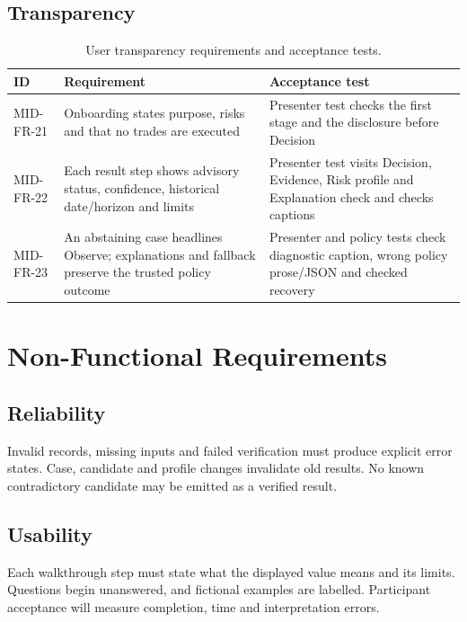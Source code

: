 \subsection{Transparency}
\begin{longtable}{p{}p{}p{}}
\caption{User transparency requirements and acceptance tests.}\label{tab:transparency-fr}\\\toprule ID & Requirement & Acceptance test\\\midrule
MID-FR-21 & Onboarding states purpose, risks and that no trades are executed & Presenter test checks the first stage and the disclosure before Decision\\
MID-FR-22 & Each result step shows advisory status, confidence, historical date/horizon and limits & Presenter test visits Decision, Evidence, Risk profile and Explanation check and checks captions\\
MID-FR-23 & An abstaining case headlines Observe; explanations and fallback preserve the trusted policy outcome & Presenter and policy tests check diagnostic caption, wrong policy prose/JSON and checked recovery\\
\bottomrule\end{longtable}
\section{Non-Functional Requirements}
\subsection{Reliability}
Invalid records, missing inputs and failed verification must produce explicit error states. Case, candidate and profile changes invalidate old results. No known contradictory candidate may be emitted as a verified result.
\subsection{Usability}
Each walkthrough step must state what the displayed value means and its limits. Questions begin unanswered, and fictional examples are labelled. Participant acceptance will measure completion, time and interpretation errors.
